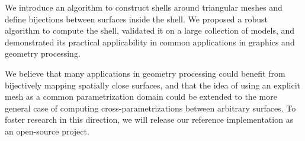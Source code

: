 We introduce an algorithm to construct shells around triangular {meshes} and define bijections between surfaces inside the shell. We proposed a robust algorithm to compute the shell,
validated it on a large collection of models, and demonstrated its practical applicability in common applications in graphics and geometry processing. 


We believe that many applications in geometry processing could benefit from bijectively mapping spatially close surfaces, and that the idea of using an explicit mesh as a common parametrization domain could be extended to the more general case of computing cross-parametrizations between arbitrary surfaces. To foster research in this direction, we will release our reference implementation as an open-source project.




